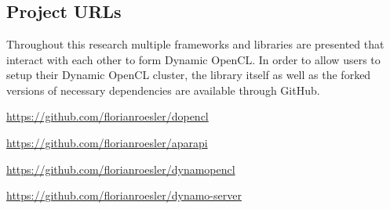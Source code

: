 \chapter{\appendixname}

\section*{Project URLs}
\label{appendix:links}
Throughout this research multiple frameworks and libraries are presented that interact with each other to form Dynamic OpenCL. In order to allow users to setup their Dynamic OpenCL cluster, the library itself as well as the forked versions of necessary dependencies are available through GitHub.

\begin{description}[align=left]
	\item [dOpenCL] \url{https://github.com/florianroesler/dopencl}
	\item [Aparapi] \url{https://github.com/florianroesler/aparapi}
	\item [Dynamic OpenCL] \url{https://github.com/florianroesler/dynamopencl}
	\item [Dynamic OpenCL Web Server Demo] \url{https://github.com/florianroesler/dynamo-server}
\end{description}

